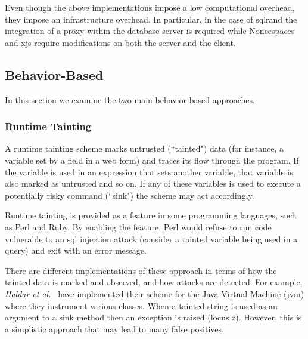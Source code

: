 \documentclass[conference]{IEEEtran}
\begin{document}
Even though the above implementations impose a low
computational overhead, they impose an infrastructure
overhead. In particular, in the case of {\sc sql}rand
the integration of a proxy within the database server
is required while Noncespaces and x{\sc js} require
modifications on both the server and the client.

\subsection{Behavior-Based}

In this section we examine the two main behavior-based
approaches.

\subsubsection{Runtime Tainting}

A runtime tainting scheme marks untrusted
(``tainted") data (for instance, a variable set
by a field in a web form) and traces its flow through
the program. If the variable is used in an expression
that sets another variable, that variable is also
marked as untrusted and so on. If any of these variables
is used to execute a potentially risky command (``sink") the
scheme may act accordingly.

Runtime tainting is provided as a feature in some
programming languages, such as Perl and Ruby.
By enabling the feature, Perl would refuse to run code
vulnerable to an {\sc sql} injection attack
(consider a tainted variable being used in a query)
and exit with an error message.

There are different implementations of these approach
in terms of how the tainted data is marked and observed,
and how attacks are detected.
For example, {\it Haldar et al.}~\cite{HCF05} have implemented
their scheme for the Java Virtual Machine ({\sc jvm})
where they instrument various classes. When a
tainted string is used as an argument to a sink method
then an exception is raised (locus {\sc z}).
However, this is a simplistic approach that may
lead to many false positives.
\end{document}
